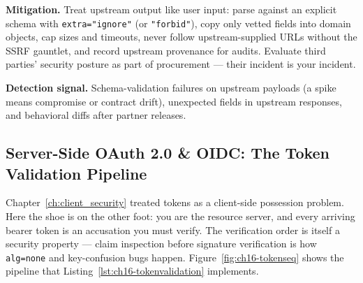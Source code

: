 \textbf{Mitigation.} Treat upstream output like user input: parse against
an explicit schema with \texttt{extra="ignore"} (or \texttt{"forbid"}),
copy only vetted fields into domain objects, cap sizes and timeouts, never
follow upstream-supplied URLs without the SSRF gauntlet, and record
upstream provenance for audits. Evaluate third parties' security posture as
part of procurement --- their incident is your incident.

\textbf{Detection signal.} Schema-validation failures on upstream payloads
(a spike means compromise or contract drift), unexpected fields in upstream
responses, and behavioral diffs after partner releases.

\subsection{Server-Side OAuth 2.0 \& OIDC: The Token Validation Pipeline}
\label{sec:ch16-tokenpipeline}

Chapter~\ref{ch:client_security} treated tokens as a client-side possession
problem. Here the shoe is on the other foot: you are the resource server,
and every arriving bearer token is an accusation you must verify. The
verification order is itself a security property --- claim inspection before
signature verification is how \texttt{alg=none} and key-confusion bugs
happen. Figure~\ref{fig:ch16-tokenseq} shows the pipeline that
Listing~\ref{lst:ch16-tokenvalidation} implements.

